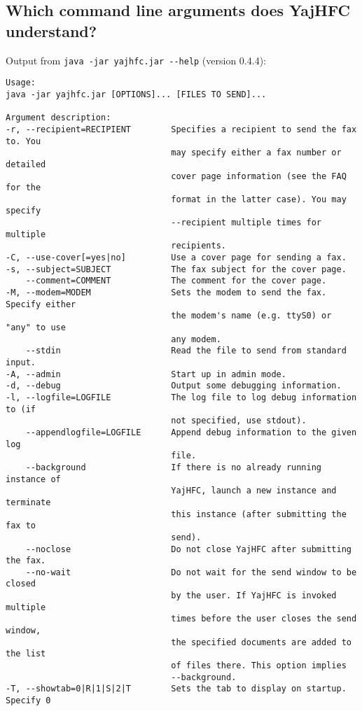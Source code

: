 \documentclass[a4paper,10pt]{scrartcl}
\begin{document}
\subsection{Which command line arguments does YajHFC understand?}

Output from \verb#java -jar yajhfc.jar --help# (version 0.4.4):
\begin{verbatim}
Usage:
java -jar yajhfc.jar [OPTIONS]... [FILES TO SEND]...

Argument description:
-r, --recipient=RECIPIENT        Specifies a recipient to send the fax to. You
                                 may specify either a fax number or detailed
                                 cover page information (see the FAQ for the
                                 format in the latter case). You may specify
                                 --recipient multiple times for multiple
                                 recipients.
-C, --use-cover[=yes|no]         Use a cover page for sending a fax.
-s, --subject=SUBJECT            The fax subject for the cover page.
    --comment=COMMENT            The comment for the cover page.
-M, --modem=MODEM                Sets the modem to send the fax. Specify either
                                 the modem's name (e.g. ttyS0) or "any" to use
                                 any modem.
    --stdin                      Read the file to send from standard input.
-A, --admin                      Start up in admin mode.
-d, --debug                      Output some debugging information.
-l, --logfile=LOGFILE            The log file to log debug information to (if
                                 not specified, use stdout).
    --appendlogfile=LOGFILE      Append debug information to the given log
                                 file.
    --background                 If there is no already running instance of
                                 YajHFC, launch a new instance and terminate
                                 this instance (after submitting the fax to
                                 send).
    --noclose                    Do not close YajHFC after submitting the fax.
    --no-wait                    Do not wait for the send window to be closed
                                 by the user. If YajHFC is invoked multiple
                                 times before the user closes the send window,
                                 the specified documents are added to the list
                                 of files there. This option implies
                                 --background.
-T, --showtab=0|R|1|S|2|T        Sets the tab to display on startup. Specify 0

\end{verbatim}
\end{document}
